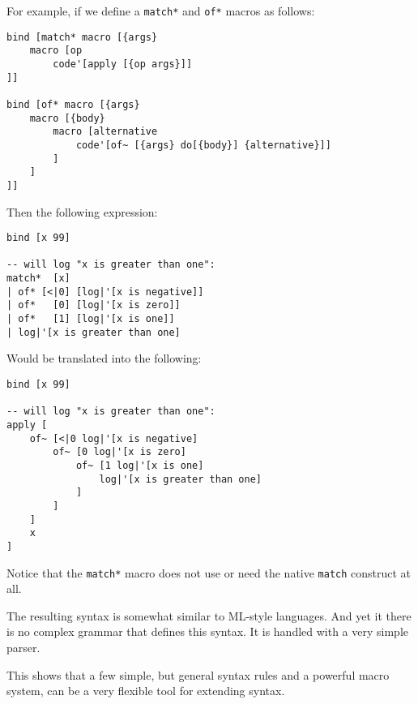 For example, if we define a \texttt{match*} and \texttt{of*} macros as follows:
\begin{lstlisting}
bind [match* macro [{args}
	macro [op
		code'[apply [{op args}]]
]]

bind [of* macro [{args}
    macro [{body}
        macro [alternative
            code'[of~ [{args} do[{body}] {alternative}]]
        ]
    ]
]]
\end{lstlisting}

Then the following expression:
\begin{lstlisting}
bind [x 99]

-- will log "x is greater than one":
match*  [x]
| of* [<|0] [log|'[x is negative]]
| of*   [0] [log|'[x is zero]]
| of*   [1] [log|'[x is one]]
| log|'[x is greater than one]
\end{lstlisting}

Would be translated into the following:
\begin{lstlisting}
bind [x 99]

-- will log "x is greater than one":
apply [
    of~ [<|0 log|'[x is negative]
        of~ [0 log|'[x is zero]
            of~ [1 log|'[x is one]
                log|'[x is greater than one]
            ]
        ]
    ]
    x
]
\end{lstlisting}

Notice that the \texttt{match*} macro does not use or need the native \texttt{match} construct at all.

The resulting syntax is somewhat similar to ML-style\cite[Section~Algebraic datatypes and pattern matching]{standard_ml_wikipedia} languages. And yet it there is no complex grammar that defines this syntax. It is handled with a very simple parser.

This shows that a few simple, but general syntax rules and a powerful macro system, can be a very flexible tool for extending syntax.
